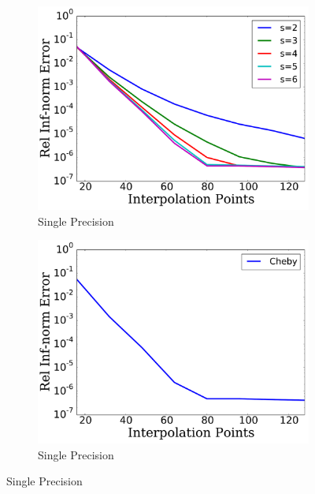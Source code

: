 
\begin{figure}[p]
    \centering
    \begin{subfigure}{0.45\textwidth}
    \includegraphics[width=\textwidth]{plots/msn_2n_fast_smooth_R_25_single.pdf}
    \caption{Single Precision}
    \end{subfigure}
    \begin{subfigure}{0.45\textwidth}
    \includegraphics[width=\textwidth]{plots/cheby_interp_smooth_R_25_single.pdf}
    \caption{Single Precision}
    \end{subfigure}


\end{figure}
